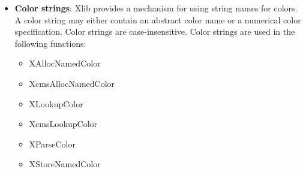 \documentclass{report}
\begin{document}
\begin{itemize}
            where $\gamma$ is the \textbf{gamma value}. A common display gamma is around 
            \begin{align*}
                \gamma \approx 2.2
            .\end{align*}
            That means displays often make raw input values appear darker than a linear brightness model would suggest.
            \bigbreak \noindent 
            For example, suppose a pixel channel is normalized between 0 and 1:
            \begin{align*}
                0.5^{2.2} \approx 0.218
            .\end{align*}
            So a numeric value of 0.5 may produce only about 21.8\% of maximum physical light output, not 50\%.
            \bigbreak \noindent 
            Gamma correction adjusts the stored or transmitted values so the displayed result looks perceptually correct.
            \bigbreak \noindent 
            In color systems, this matters because RGB values are usually not pure physical light intensities. They are often encoded values meant to look correct on a display. For example, an RGB value like:
            \bigbreak \noindent 
            \begin{cppcode}
            R = 128, G = 128, B = 128
            \end{cppcode}
            \bigbreak \noindent 
            is not necessarily “half the light” of white. It is a gamma-encoded middle gray intended to look visually halfway between black and white.
            \bigbreak \noindent 
            Gamma correcting an RGB value means changing the numeric channel values so that the final displayed brightness matches the intended perceived or physical brightness.
        \item \textbf{Color strings}: Xlib provides a mechanism for using string names for colors. A color string may either contain an abstract color name or a numerical color specification. Color strings are case-insensitive.
            \bigbreak \noindent 
            Color strings are used in the following functions:
            \begin{itemize}
                \item XAllocNamedColor
                \item XcmsAllocNamedColor
                \item XLookupColor
                \item XcmsLookupColor
                \item XParseColor
                \item XStoreNamedColor

\end{itemize}
\end{itemize}
\end{document}
